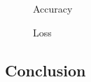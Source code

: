 \documentclass[
  letterpaper,
  DIV=11,
  numbers=noendperiod]{scrartcl}
\begin{document}
\begin{figure}

\begin{minipage}[b]{0.50\linewidth}

{\centering 


\caption{Accuracy}

}

\end{minipage}%
%
\begin{minipage}[b]{0.50\linewidth}

{\centering 


\caption{Loss}

}

\end{minipage}%

\end{figure}

\hypertarget{conclusion}{%
\subsection{Conclusion}\label{conclusion}}
\end{document}
